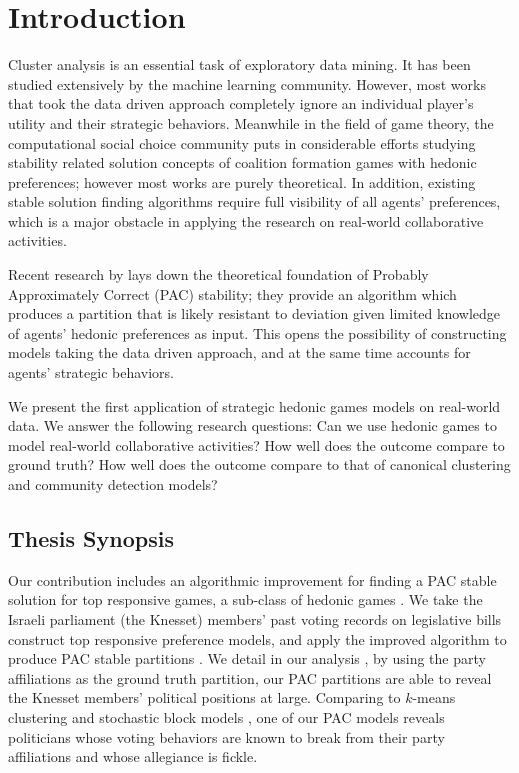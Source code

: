 
\chapter{Introduction}
\vspace{2em}

Cluster analysis is an essential task of exploratory data mining.
It has been studied extensively by the machine learning community.
However, most works that took the data driven approach completely ignore an individual player's utility and their strategic behaviors.
Meanwhile in the field of game theory, the computational social choice community puts in considerable efforts studying stability related solution concepts of coalition formation games with hedonic preferences;
however most works are purely theoretical.
In addition, existing stable solution finding algorithms require full visibility of all agents' preferences, which is a major obstacle in applying the research on real-world collaborative activities.

Recent research by  lays down the theoretical foundation of Probably Approximately Correct (PAC) stability;
they provide an algorithm which produces a partition that is likely resistant to deviation given limited knowledge of agents' hedonic preferences as input.
This opens the possibility of constructing models taking the data driven approach, and at the same time accounts for agents' strategic behaviors.

We present the first application of strategic hedonic games models on real-world data.
We answer the following research questions: Can we use hedonic games to model real-world collaborative activities?
How well does the outcome compare to ground truth?
How well does the outcome compare to that of canonical clustering and community detection models?


\section{Thesis Synopsis}
Our contribution includes an algorithmic improvement for finding a PAC stable solution for top responsive games, a sub-class of hedonic games
.  We take the Israeli parliament (the Knesset) members' past voting records on legislative bills 
construct top responsive preference models, and apply the improved algorithm to produce PAC stable partitions
.  We detail in our analysis 
, by using the party affiliations as the ground truth partition,
our PAC partitions are able to reveal the Knesset members' political positions at large. 
Comparing to $k$-means clustering and stochastic block models 
, one of our PAC models reveals politicians whose voting behaviors are known to break from their party affiliations and whose allegiance is fickle.

